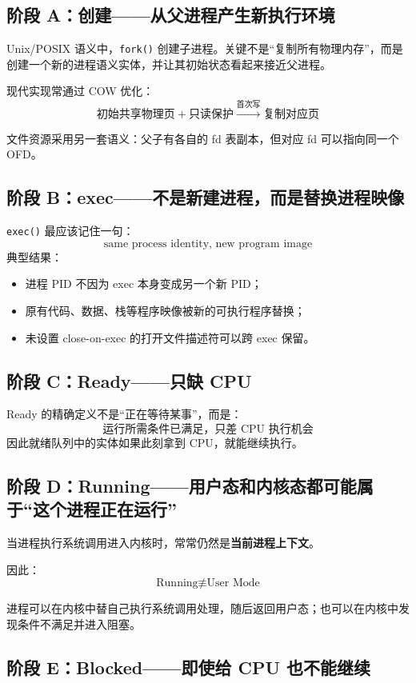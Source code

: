 \documentclass[11pt,a4paper]{ctexart}
\newcommand{\kw}[1]{\textbf{#1}}
\newcommand{\code}[1]{\texttt{#1}}
\begin{document}
\subsection{阶段 A：创建——从父进程产生新执行环境}

Unix/POSIX 语义中，\code{fork()} 创建子进程。关键不是“复制所有物理内存”，而是创建一个新的进程语义实体，并让其初始状态看起来接近父进程。

现代实现常通过 COW 优化：
\[
\text{初始共享物理页}+\text{只读保护}\xrightarrow{\text{首次写}}\text{复制对应页}
\]

文件资源采用另一套语义：父子有各自的 fd 表副本，但对应 fd 可以指向同一个 OFD。

\subsection{阶段 B：exec——不是新建进程，而是替换进程映像}

\code{exec()} 最应该记住一句：
\[
\boxed{\text{same process identity, new program image}}
\]
典型结果：
\begin{itemize}
\item 进程 PID 不因为 exec 本身变成另一个新 PID；
\item 原有代码、数据、栈等程序映像被新的可执行程序替换；
\item 未设置 close-on-exec 的打开文件描述符可以跨 exec 保留。
\end{itemize}

\subsection{阶段 C：Ready——只缺 CPU}

Ready 的精确定义不是“正在等待某事”，而是：
\[
\boxed{\text{运行所需条件已满足，只差 CPU 执行机会}}
\]
因此就绪队列中的实体如果此刻拿到 CPU，就能继续执行。

\subsection{阶段 D：Running——用户态和内核态都可能属于“这个进程正在运行”}

当进程执行系统调用进入内核时，常常仍然是\kw{当前进程上下文}。

因此：
\[
\text{Running}\not\equiv\text{User Mode}
\]

进程可以在内核中替自己执行系统调用处理，随后返回用户态；也可以在内核中发现条件不满足并进入阻塞。

\subsection{阶段 E：Blocked——即使给 CPU 也不能继续}
\end{document}
